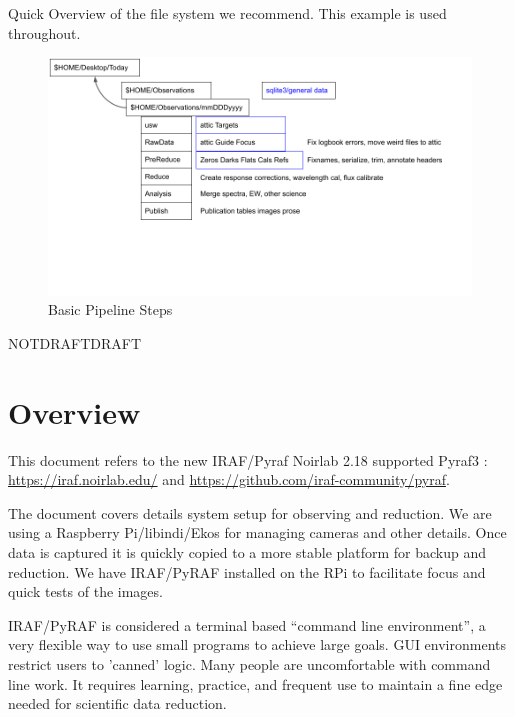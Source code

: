 \documentclass[letter,11pt,oneside]{article}
\def\documentisdraft{NOTDRAFT}
\def\drafttest{DRAFT}
\begin{document}
\clearpage

Quick Overview of the file system we recommend. This example is used throughout.

\vskip 2cm
\begin{figure}[h!]
\centering
\includegraphics[width=.8\textwidth]{images/Overview1.png}
\caption{Basic Pipeline Steps} %
\label{figure:basicpipeline}
\end{figure}

\clearpage

\setcounter{section}{0}

\ifx\documentisdraft\drafttest
\linenumbers    %
\fi

\clearpage
{}



\section*{Overview}

This document refers to the new IRAF/Pyraf Noirlab 2.18 supported
Pyraf3 : \url{https://iraf.noirlab.edu/} and
\url{https://github.com/iraf-community/pyraf}.

The document covers details system setup for observing and reduction.
We are using a Raspberry Pi/libindi/Ekos for managing cameras and
other details. Once data is captured it is quickly copied to a more
stable platform for backup and reduction. We have IRAF/PyRAF installed
on the RPi to facilitate focus and quick tests of the images.

IRAF/PyRAF is considered a terminal based ``command line
environment'', a very flexible way to use small programs to achieve
large goals. GUI environments restrict users to 'canned' logic. Many
people are uncomfortable with command line work. It requires learning,
practice, and frequent use to maintain a fine edge needed for scientific
data reduction.
\end{document}
